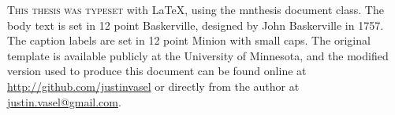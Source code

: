 %
%
%
%

\begin{minipage}{0.7\textwidth}
	\onehalfspacing
	\minion
	\large
	\raggedright\lettrine[lines=2,slope=-2pt,nindent=-4pt]{\textcolor{BrickRed}T}{his thesis was typeset} with \LaTeX, using the mnthesis document class. The body text is set in 12 point Baskerville, designed by John Baskerville in 1757. The caption labels are set in 12 point Minion with small caps. The original template is available publicly at the University of Minnesota, and the modified version used to produce this document can be found online at \href{http://github.com/justinvasel/}{http://github.com/justinvasel} or directly from the author at \href{mailto:justin.vasel@gmail.com}{justin.vasel@gmail.com}.
	\normalsize
	\normalfont
\end{minipage}

